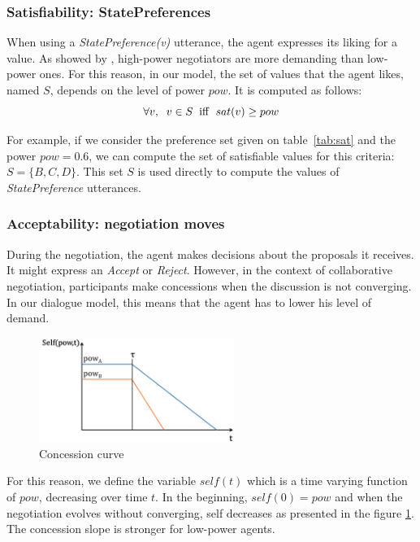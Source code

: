 \documentclass[sigconf]{aamas}  %
\begin{document}
	\subsubsection{Satisfiability: StatePreferences}
	\label{sec:sat}
	When using a \emph{StatePreference(v)} utterance, the agent expresses its liking for a value. As showed by \cite{de1995impact}, high-power negotiators are more demanding than low-power ones. For this reason, in our model, the set of values that the agent likes, named $S$, depends on the level of power $pow$. It is computed as follows:
	\begin{equation}
	\forall v,\hspace{2mm} v\in S\hspace{2mm}\mathrm{iff}\hspace{2mm}sat(v) \geq pow
	\end{equation}
	
	For example, if we consider the preference set given on table~\ref{tab:sat} and the power $pow=0.6$, we can compute the set of satisfiable values for this criteria: $S = \{B, C, D\}$. This set $S$ is used directly to compute the values of \emph{StatePreference} utterances.
	
	\subsubsection{Acceptability: negotiation moves}
	During the negotiation, the agent makes decisions about the proposals it receives. It might express an \emph{Accept} or \emph{Reject}. However, in the context of collaborative negotiation, participants make concessions when the discussion is not converging. In our dialogue model, this means that the agent has to lower his level of demand.
	
		\begin{figure}[t]
			\includegraphics[width=2.5in]{figs/sv3.png}
			\caption{\label{fig:conc}Concession curve}
		\end{figure} 
		
	For this reason, we define the variable $self(t)$ which is a time varying function of $pow$, decreasing over time $t$. In the beginning, $self(0) = pow$ and when the negotiation evolves without converging, self decreases as presented in the figure \ref{fig:conc}. The concession slope is stronger for low-power agents.
	
\end{document}
